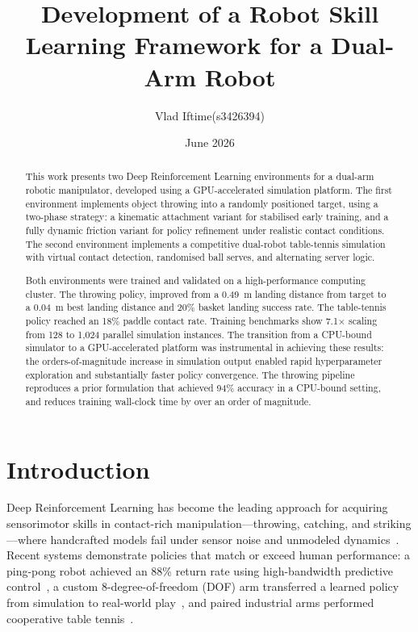 \documentclass[11pt, a4paper]{article}
\title{\textbf{Development of a Robot Skill Learning Framework for a Dual-Arm Robot}}
\author{Vlad Iftime(s3426394)}
\date{June 2026}
\begin{document}
\maketitle

\begin{abstract}
This work presents two Deep Reinforcement Learning environments for a dual-arm robotic manipulator, developed using a GPU-accelerated simulation platform. The first environment implements object throwing into a randomly positioned target, using a two-phase strategy: a kinematic attachment variant for stabilised early training, and a fully dynamic friction variant for policy refinement under realistic contact conditions. The second environment implements a competitive dual-robot table-tennis simulation with virtual contact detection, randomised ball serves, and alternating server logic.

Both environments were trained and validated on a high-performance computing cluster. The throwing policy, improved from a 0.49~m landing distance from target to a 0.04~m best landing distance and 20\% basket landing success rate. The table-tennis policy reached an 18\% paddle contact rate. Training benchmarks show 7.1$\times$ scaling from 128 to 1,024 parallel simulation instances. The transition from a CPU-bound simulator to a GPU-accelerated platform was instrumental in achieving these results: the orders-of-magnitude increase in simulation output enabled rapid hyperparameter exploration and substantially faster policy convergence. The throwing pipeline reproduces a prior formulation that achieved 94\% accuracy in a CPU-bound setting, and reduces training wall-clock time by over an order of magnitude.
\end{abstract}

\section{Introduction}
\label{sec:intro}

Deep Reinforcement Learning has become the leading approach for acquiring sensorimotor skills in contact-rich manipulation---throwing, catching, and striking---where handcrafted models fail under sensor noise and unmodeled dynamics~\cite{plappert2021asymmetric,sukhbaatar2018learning}. Recent systems demonstrate policies that match or exceed human performance: a ping-pong robot achieved an 88\% return rate using high-bandwidth predictive control~\cite{mit_pingpong}, a custom 8-degree-of-freedom (DOF) arm transferred a learned policy from simulation to real-world play~\cite{sony_ace}, and paired industrial arms performed cooperative table tennis~\cite{columbia_tt}.
\end{document}
